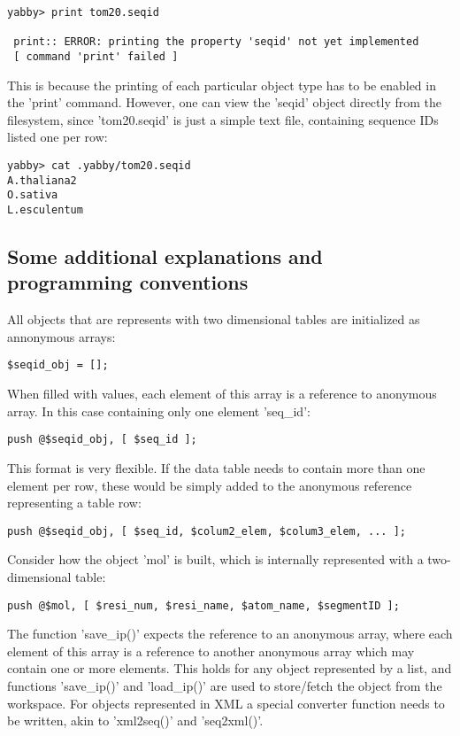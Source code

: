 \begin{verbatim}
yabby> print tom20.seqid

 print:: ERROR: printing the property 'seqid' not yet implemented
 [ command 'print' failed ]
\end{verbatim}

This is because the printing of each particular object type has to
be enabled in the 'print' command. However, one can view the 'seqid'
object directly from the filesystem, since 'tom20.seqid' is just
a simple text file, containing sequence IDs listed one per row:

\begin{verbatim}
yabby> cat .yabby/tom20.seqid
A.thaliana2
O.sativa
L.esculentum
\end{verbatim}

\subsection{Some additional explanations and programming conventions}

All objects that are represents with two dimensional tables are
initialized as annonymous arrays:

\begin{verbatim}
$seqid_obj = [];
\end{verbatim}

When filled with values, each element of this array is a reference
to anonymous array. In this case containing only one element 'seq\_id':

\begin{verbatim}
push @$seqid_obj, [ $seq_id ];
\end{verbatim}

This format is very flexible.  If the data table needs to contain more
than one element per row, these would be simply added to the anonymous
reference representing a table row:

\begin{verbatim}
push @$seqid_obj, [ $seq_id, $colum2_elem, $colum3_elem, ... ];
\end{verbatim}

Consider how the object 'mol' is built, which is internally represented
with a two-dimensional table:

\begin{verbatim}
push @$mol, [ $resi_num, $resi_name, $atom_name, $segmentID ];
\end{verbatim}

The function 'save\_ip()' expects the reference to an anonymous array,
where each element of this array is a reference to another anonymous
array which may contain one or more elements. This holds for any
object represented by a list, and functions 'save\_ip()' and
'load\_ip()' are used to store/fetch the object from the workspace.
For objects represented in XML a special converter function needs
to be written, akin to 'xml2seq()' and 'seq2xml()'.

